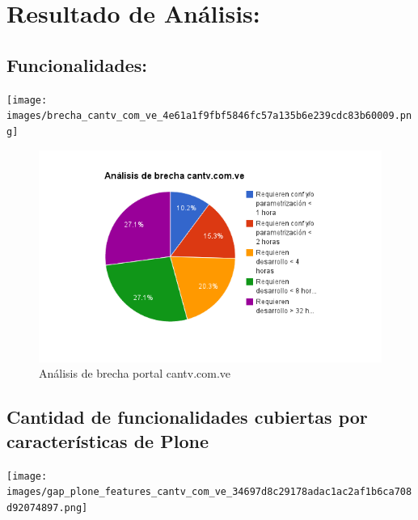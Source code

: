 \documentclass[11pt, letterpaper, oneside, spanish]{scrbook}
\begin{document}
\chapter{Resultado de Análisis:}
\label{sec-3}
\section{Funcionalidades:}
\label{sec-3-1}



\texttt{[image: images/brecha\_cantv\_com\_ve\_4e61a1f9fbf5846fc57a135b6e239cdc83b60009.png]}



    \begin{figure}[htb]
    \centering
    \includegraphics[width=.9\linewidth]{./images/graph_brecha_cantv_com_ve.png}
    \caption{Análisis de brecha portal cantv.com.ve}
    \end{figure}
\clearpage
\section{Cantidad de funcionalidades cubiertas por características de Plone}
\label{sec-3-2}



\texttt{[image: images/gap\_plone\_features\_cantv\_com\_ve\_34697d8c29178adac1ac2af1b6ca708d92074897.png]}
\end{document}
